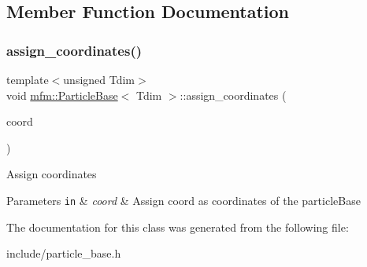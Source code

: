 \subsection{Member Function Documentation}
\mbox{\label{classmfm_1_1_particle_base_a8ba22c9e8a5f67995013241843a3c0f4}} 
\subsubsection{\texorpdfstring{assign\+\_\+coordinates()}{assign\_coordinates()}}
{\footnotesize\ttfamily template$<$unsigned Tdim$>$ \\
void \hyperlink{classmfm_1_1_particle_base}{mfm\+::\+Particle\+Base}$<$ Tdim $>$\+::assign\+\_\+coordinates (\begin{DoxyParamCaption}\item[{const \hyperlink{classmfm_1_1_particle_base_afbf037646f60380710274aeddce74480}{Vector\+Dim} \&}]{coord }\end{DoxyParamCaption})\hspace{0.3cm}{\ttfamily [inline]}}

Assign coordinates 
\begin{DoxyParams}[1]{Parameters}
\mbox{\tt in}  & {\em coord} & Assign coord as coordinates of the particle\+Base \\
\hline
\end{DoxyParams}


The documentation for this class was generated from the following file\+:\begin{DoxyCompactItemize}
\item 
include/particle\+\_\+base.\+h\end{DoxyCompactItemize}
